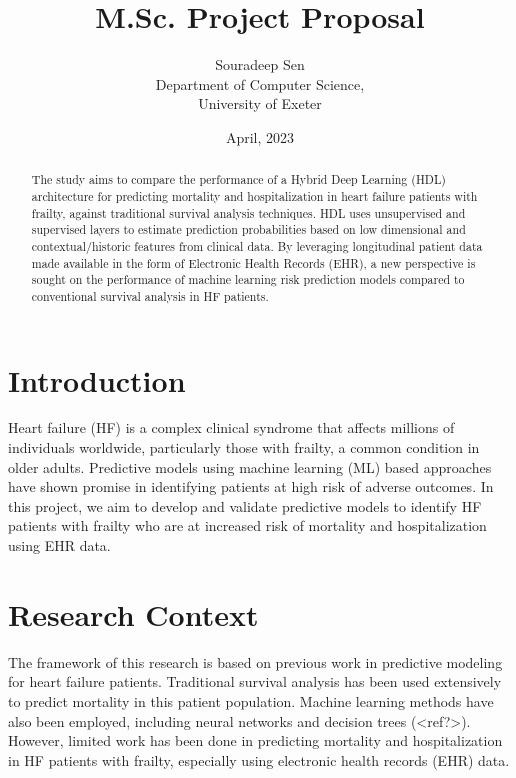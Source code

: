 \documentclass[%
 reprint,
 amsmath,amssymb,
 aps,
 nofootinbib
]{revtex4-2}
\theoremstyle{definition}
\begin{document}

\title{M.Sc. Project Proposal}%
\author{Souradeep Sen \\
	 \small Department of Computer Science, \\ 
	 \small University of Exeter
	}

\date{April, 2023}%

\begin{abstract}
The study aims to compare the performance of a Hybrid Deep Learning (HDL) architecture for predicting mortality and hospitalization in heart failure patients with frailty, against traditional survival analysis techniques. HDL uses unsupervised and supervised layers to estimate prediction probabilities based on low dimensional and contextual/historic features from clinical data. By leveraging longitudinal patient data made available in the form of Electronic Health Records (EHR), a new perspective is sought on the performance of machine learning risk prediction models compared to conventional survival analysis in HF patients.
\end{abstract}


\maketitle

\section{\label{intro}Introduction}
Heart failure (HF) is a complex clinical syndrome that affects millions of individuals worldwide, particularly those with frailty, a common condition in older adults. Predictive models using machine learning (ML) based approaches have shown promise in identifying patients at high risk of adverse outcomes. In this project, we aim to develop and validate predictive models to identify HF patients with frailty who are at increased risk of mortality and hospitalization using EHR data. 

\section{\label{rescon}Research Context}
The framework of this research is based on previous work in predictive modeling for heart failure patients. Traditional survival analysis has been used extensively to predict mortality in this patient population. Machine learning methods have also been employed, including neural networks and decision trees (<ref?>). However, limited work has been done in predicting mortality and hospitalization in HF patients with frailty, especially using electronic health records (EHR) data.
\end{document}

